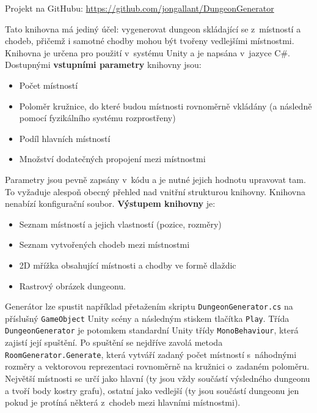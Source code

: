 \noindent Projekt na GitHubu: \url{https://github.com/jongallant/DungeonGenerator}\medskip

Tato knihovna má jediný účel: vygenerovat dungeon skládající se z~místností a chodeb, přičemž i samotné chodby mohou být tvořeny vedlejšími místnostmi.
Knihovna je určena pro použití v~systému Unity a je napsána v~jazyce C\#.
Dostupnými \textbf{vstupními parametry} knihovny jsou:
\begin{itemize}
    \item Počet místností
    \item Poloměr kružnice, do které budou místnosti rovnoměrně vkládány (a následně pomocí fyzikálního systému rozprostřeny)
    \item Podíl hlavních místností
    \item Množství dodatečných propojení mezi místnostmi
\end{itemize}
Parametry jsou pevně zapsány v~kódu a je nutné jejich hodnotu upravovat tam.
To vyžaduje alespoň obecný přehled nad vnitřní strukturou knihovny.
Knihovna nenabízí konfigurační soubor.
\textbf{Výstupem knihovny} je:
\begin{itemize}
    \item Seznam místností a jejich vlastností (pozice, rozměry)
    \item Seznam vytvořených chodeb mezi místnostmi
    \item 2D mřížka obsahující místnosti a chodby ve formě dlaždic
    \item Rastrový obrázek dungeonu.
\end{itemize}
Generátor lze spustit například přetažením skriptu \texttt{DungeonGenerator.cs} na příslušný \texttt{GameObject} Unity scény a následným stiskem tlačítka \texttt{Play}.
Třída \texttt{DungeonGenerator} je potomkem standardní Unity třídy \texttt{MonoBehaviour}, která zajistí její spuštění.
Po spuštění se nejdříve zavolá metoda \texttt{RoomGenerator.Generate}, která vytváří zadaný počet místností s~náhodnými rozměry a vektorovou reprezentaci rovnoměrně na kružnici o~zadaném poloměru.
Největší místnosti se určí jako hlavní (ty jsou vždy součástí výsledného dungeonu a tvoří body kostry grafu), ostatní jako vedlejší (ty jsou součástí dungeonu jen pokud je protíná některá z~chodeb mezi hlavními místnostmi).
